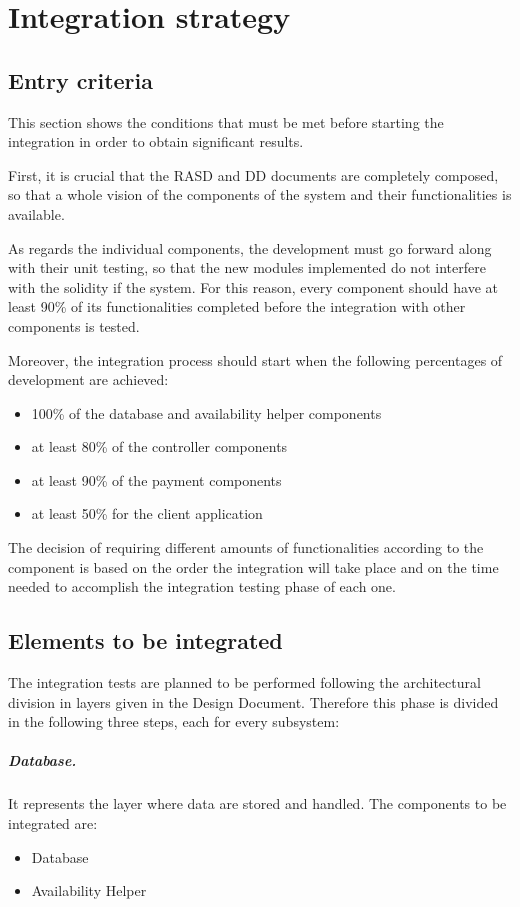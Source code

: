 \chapter{Integration strategy}

\section{Entry criteria}
This section shows the conditions that must be met before starting the integration in order to obtain significant results.

First, it is crucial that the RASD and DD documents are completely composed, so that a whole vision of the components of the system and their functionalities is available.

As regards the individual components, the development must go forward along with their unit testing, so that the new modules implemented do not interfere with the solidity if the system. For this reason, every component should have at least 90\% of its functionalities completed before the integration with other components is tested.

Moreover, the integration process should start when the following percentages of development are achieved:
\begin{itemize}
	\item 100\% of the database and availability helper components
	\item at least 80\% of the controller components
	\item at least 90\% of the payment components
	\item at least 50\% for the client application
\end{itemize}

The decision of requiring different amounts of functionalities according to the component is based on the order the integration will take place and on the time needed to accomplish the integration testing phase of each one.

\section{Elements to be integrated}
The integration tests are planned to be performed following the architectural division in layers given in the Design Document. Therefore this phase is divided in the following three steps, each for every subsystem:

\paragraph{Database.} It represents the layer where data are stored and handled. The components to be integrated are:
\begin{itemize}
	\item Database
	\item Availability Helper
\end{itemize}

